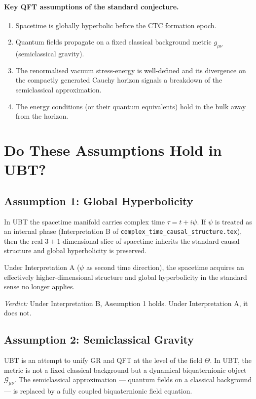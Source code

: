 \documentclass[12pt]{article}
\begin{document}
\paragraph{Key QFT assumptions of the standard conjecture.}
\begin{enumerate}
  \item Spacetime is globally hyperbolic before the CTC formation epoch.
  \item Quantum fields propagate on a fixed classical background metric
    $g_{\mu\nu}$ (semiclassical gravity).
  \item The renormalised vacuum stress-energy is well-defined and its
    divergence on the compactly generated Cauchy horizon signals a
    breakdown of the semiclassical approximation.
  \item The energy conditions (or their quantum equivalents) hold in the
    bulk away from the horizon.
\end{enumerate}

\section{Do These Assumptions Hold in UBT?}
\subsection{Assumption 1: Global Hyperbolicity}
In UBT the spacetime manifold carries complex time $\tau = t + i\psi$.
If $\psi$ is treated as an internal phase (Interpretation B of
\texttt{complex\_time\_causal\_structure.tex}), then the real
$3+1$-dimensional slice of spacetime inherits the standard causal
structure and global hyperbolicity is preserved.

Under Interpretation A ($\psi$ as second time direction), the spacetime
acquires an effectively higher-dimensional structure and global
hyperbolicity in the standard sense no longer applies.

\textit{Verdict:} Under Interpretation B, Assumption 1 holds.  Under
Interpretation A, it does not.

\subsection{Assumption 2: Semiclassical Gravity}
UBT is an attempt to unify GR and QFT at the level of the field
$\Theta$.  In UBT, the metric is not a fixed classical background but
a dynamical biquaternionic object $\mathcal{G}_{\mu\nu}$.  The
semiclassical approximation — quantum fields on a classical background —
is replaced by a fully coupled biquaternionic field equation.
\end{document}

